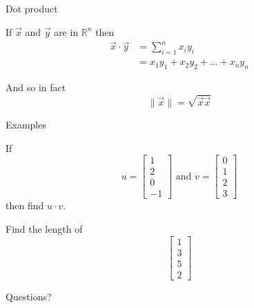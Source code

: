 \documentclass{beamer}
\begin{document}
\begin{frame}{Dot product}
  \begin{definition}
    If $\vec{x}$ and $\vec{y}$ are in $\mathbb R^n$ then
    \begin{align*}
      \vec{x}\cdot\vec{y} &= \sum_{i=1}^n x_iy_i\\
                          &= x_1y_1+x_2y_2+\dots +x_ny_n
    \end{align*}
  \end{definition}\vfill
  And so in fact
  \begin{equation*}
    \|\vec{x}\| = \sqrt{\vec{x}\vec{x}}
  \end{equation*}
\end{frame}

\begin{frame}{Examples}
  \begin{example}
    If \begin{equation*}
      u=\left[
	\begin{array}{c}
          1\\
          2\\
          0\\
          -1
	\end{array}
      \right]\text{ and }
      v = \left[
	\begin{array}{c}
          0\\
          1\\
          2\\
          3
	\end{array}
      \right]
    \end{equation*}
    then find $u\cdot v$.
  \end{example}
  \begin{example}
    Find the length of
    \begin{equation*}
      \left[
	\begin{array}{c}
          1\\
          3\\
          5\\
          2
	\end{array}
      \right]
    \end{equation*}
  \end{example}
\end{frame}

\begin{frame}
  Questions?
\end{frame}
\end{document}
